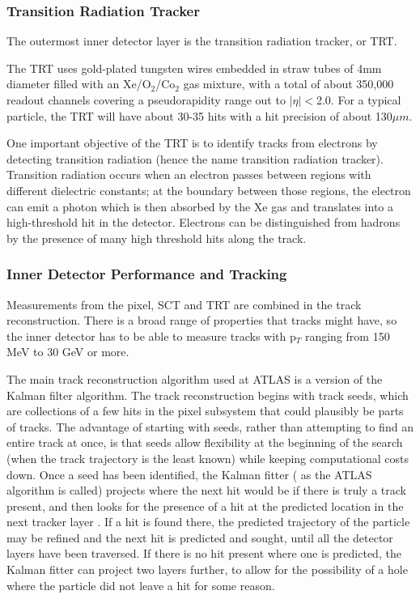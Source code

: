 \subsubsection{Transition Radiation Tracker}
\label{sec:trt}
The outermost inner detector layer is the transition radiation tracker, or TRT.  

The TRT uses gold-plated tungsten wires embedded in straw tubes of 4mm diameter filled with an Xe/O$_2$/Co$_2$ 
gas mixture, with a total of about 350,000 readout channels covering a pseudorapidity range out to $|\eta|<$2.0.
  For a typical particle, the TRT will have about 30-35 hits with a hit precision of about 130$\mu m$.

One important objective of the TRT is to identify tracks from electrons by detecting transition radiation (hence the name 
transition radiation tracker).  Transition radiation occurs when an electron passes between regions with different 
dielectric constants; at the boundary between those regions, the electron can emit a photon which is then absorbed 
by the Xe gas and translates into a high-threshold hit in the detector.  Electrons can be distinguished 
from hadrons by the presence of many high threshold hits along the track.

 
\subsubsection{Inner Detector Performance and Tracking}
\label{sec:id_perf}
Measurements from the pixel, SCT and TRT are combined in the track reconstruction.  There is a broad range 
of properties that tracks might have, so the inner detector has to be able to measure tracks with p$_T$
 ranging from 150 MeV to 30 GeV or more.   

The main track reconstruction algorithm used at ATLAS is a version of the Kalman filter algorithm.  The track reconstruction 
begins with track seeds, which are collections of a few hits in the pixel subsystem that could plausibly be 
parts of tracks.  The advantage of starting with seeds, rather than attempting to find an entire track at 
once, is that seeds allow flexibility at the beginning of the search (when the track trajectory is the 
least known) while keeping computational costs down.  Once a seed has been identified, the Kalman fitter (
as the ATLAS algorithm is called) projects where the next hit would be if there is truly a track 
present, and then looks for the presence of a hit at the predicted location in the next tracker layer
.  If a hit is found there, the predicted trajectory of the particle may be refined and the next 
hit is predicted and sought, until all the detector layers have been traversed. If there is no hit 
present where one is predicted, the Kalman fitter can project two layers further, to allow for the possibility 
of a hole where the particle did not leave a hit for some reason. 

